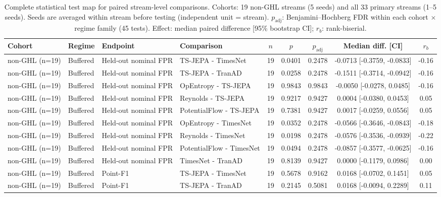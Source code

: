 \begin{table}[t]
\centering
\scriptsize
\caption{Complete statistical test map for paired stream-level comparisons. Cohorts: 19 non-GHL streams (5 seeds) and all 33 primary streams (1--5 seeds). Seeds are averaged within stream before testing (independent unit = stream). $p_{\mathrm{adj}}$: Benjamini--Hochberg FDR within each cohort $\times$ regime family (45 tests). Effect: median paired difference [95\% bootstrap CI]; $r_b$: rank-biserial.}
\label{tab:test_map}
\scriptsize
\setlength{\tabcolsep}{2.5pt}
\begin{tabular}{@{}llllccccc@{}}
\toprule
Cohort & Regime & Endpoint & Comparison & $n$ & $p$ & $p_{\mathrm{adj}}$ & Median diff. [CI] & $r_b$ \\
\midrule
non-GHL (n=19) & Buffered & Held-out nominal FPR & TS-JEPA - TimesNet & 19 & 0.0401 & 0.2478 & -0.0713 [-0.3759, -0.0833] & -0.16 \\
non-GHL (n=19) & Buffered & Held-out nominal FPR & TS-JEPA - TranAD & 19 & 0.0258 & 0.2478 & -0.1511 [-0.3714, -0.0942] & -0.16 \\
non-GHL (n=19) & Buffered & Held-out nominal FPR & OpEntropy - TS-JEPA & 19 & 0.9843 & 0.9843 & -0.0050 [-0.0278, 0.0485] & -0.16 \\
non-GHL (n=19) & Buffered & Held-out nominal FPR & Reynolds - TS-JEPA & 19 & 0.9217 & 0.9427 & 0.0004 [-0.0380, 0.0453] & 0.05 \\
non-GHL (n=19) & Buffered & Held-out nominal FPR & PotentialFlow - TS-JEPA & 19 & 0.7381 & 0.9427 & 0.0017 [-0.0259, 0.0556] & 0.05 \\
non-GHL (n=19) & Buffered & Held-out nominal FPR & OpEntropy - TimesNet & 19 & 0.0352 & 0.2478 & -0.0566 [-0.3646, -0.0843] & -0.18 \\
non-GHL (n=19) & Buffered & Held-out nominal FPR & Reynolds - TimesNet & 19 & 0.0198 & 0.2478 & -0.0576 [-0.3536, -0.0939] & -0.22 \\
non-GHL (n=19) & Buffered & Held-out nominal FPR & PotentialFlow - TimesNet & 19 & 0.0494 & 0.2478 & -0.0857 [-0.3577, -0.0625] & -0.16 \\
non-GHL (n=19) & Buffered & Held-out nominal FPR & TimesNet - TranAD & 19 & 0.8139 & 0.9427 & 0.0000 [-0.1179, 0.0986] & 0.00 \\
non-GHL (n=19) & Buffered & Point-F1 & TS-JEPA - TimesNet & 19 & 0.5678 & 0.9162 & 0.0168 [-0.0702, 0.1451] & 0.05 \\
non-GHL (n=19) & Buffered & Point-F1 & TS-JEPA - TranAD & 19 & 0.2145 & 0.5081 & 0.0168 [-0.0094, 0.2289] & 0.11 \\

\end{tabular}
\end{table}
